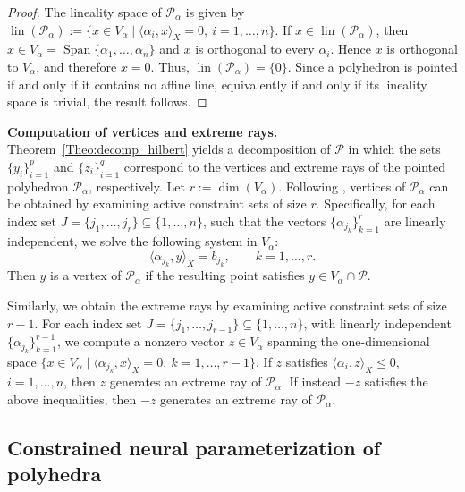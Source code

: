\documentclass{article}
\numberwithin{equation}{section}
\begin{document}
\begin{proof}
The lineality space of $\mathcal{P}_\alpha$ is given by
$\operatorname{lin}(\mathcal{P}_\alpha)
:=
\{x\in V_\alpha \mid \langle \alpha_i,x\rangle_X=0,\ i=1,\dots,n\}$.
If $x\in \operatorname{lin}(\mathcal{P}_\alpha)$, then $x\in V_\alpha=\operatorname{Span}\{\alpha_1,\dots,\alpha_n\}$ and $x$ is orthogonal to every $\alpha_i$. Hence $x$ is orthogonal to $V_\alpha$, and therefore $x=0$. Thus, $\operatorname{lin}(\mathcal{P}_\alpha)=\{0\}.$ Since a polyhedron is pointed if and only if it contains no affine line, equivalently if and only if its lineality space is trivial, the result follows.
\end{proof}


{\bf Computation of vertices and extreme rays.} Theorem~\ref{Theo:decomp_hilbert} yields a decomposition of $\mathcal{P}$ in which the sets 
$\{y_i\}_{i=1}^p$ and $\{z_i\}_{i=1}^q$ correspond to the vertices and extreme rays of the pointed polyhedron $\mathcal{P}_\alpha$, respectively. Let $r:=\dim(V_\alpha)$. Following \cite{bertsekas2003convex}, vertices of $\mathcal{P}_\alpha$ can be obtained by examining active constraint sets of size $r$. 
Specifically, for each index set
$J=\{j_1,\dots,j_r\}\subseteq \{1,\dots,n\}$,
such that the vectors $\{\alpha_{j_k}\}_{k=1}^r$ are linearly independent, we solve the following system in $V_\alpha$:
\[
\langle \alpha_{j_k},y\rangle_X=b_{j_k},\qquad k=1,\dots,r.
\]
Then $y$ is a vertex of $\mathcal{P}_\alpha$ if the resulting point satisfies  $y\in V_\alpha\cap\mathcal{P}$.

Similarly, we obtain the extreme rays by examining active constraint sets of size $r-1$. 
For each index set
$J=\{j_1,\dots,j_{r-1}\}\subseteq\{1,\dots,n\}$,
with linearly independent $\{\alpha_{j_k}\}_{k=1}^{r-1}$, we compute a nonzero vector $z\in V_\alpha$ spanning the one-dimensional space
$\{x\in V_\alpha\mid \langle \alpha_{j_k},x\rangle_X=0,\ k=1,\dots,r-1\}$.
If $z$ satisfies
$\langle \alpha_i,z\rangle_X\le 0$, $i=1,\dots,n$,
then $z$ generates an extreme ray of $\mathcal{P}_\alpha$. 
If instead $-z$ satisfies the above inequalities, then $-z$ generates an extreme ray of $\mathcal{P}_\alpha$.

\subsection{Constrained neural parameterization of polyhedra}
\end{document}

